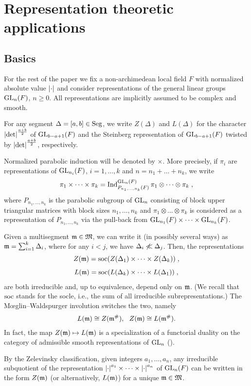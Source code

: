 \documentclass{ert-l} %
\begin{document}
\section{Representation theoretic applications}\label{sec: rep}

\subsection{Basics}
For the rest of the paper we fix a non-archimedean local field $F$ with normalized absolute value $\left|{\cdot}\right|$
and consider representations of the general linear groups $\operatorname{GL}_n(F)$, $n\ge0$.
All representations are implicitly assumed to be complex and smooth.

For any segment $\Delta=[a,b]\in \operatorname{Seg}$, we write $Z(\Delta)$ and $L(\Delta)$ for the character $\left|{\det}\right|^{\frac{a+b}2}$ of $\operatorname{GL}_{b-a+1}(F)$
and the Steinberg representation of $\operatorname{GL}_{b-a+1}(F)$ twisted by $\left|{\det}\right|^{\frac{a+b}2}$, respectively.

Normalized parabolic induction will be denoted by $\times$. More precisely, if $\pi_i$ are representations
of $\operatorname{GL}_{n_i}(F)$, $i=1,\dots,k$ and $n=n_1+\dots+n_k$, we write
\[
\pi_1\times\dots\times\pi_k=\operatorname{Ind}_{P_{n_1,\dots,n_k}(F)}^{\operatorname{GL}_n(F)}\pi_1\otimes\dots\otimes\pi_k\;,
\]
where $P_{n_1,\dots,n_k}$ is the parabolic subgroup of $\operatorname{GL}_n$ consisting of block upper triangular matrices
with block sizes $n_1,\dots,n_k$ and $\pi_1\otimes\dots\otimes\pi_k$ is considered as a representation of
$P_{n_1,\dots,n_k}$ via the pull-back from $\operatorname{GL}_{n_1}(F)\times\dots\times\operatorname{GL}_{n_k}(F)$.


Given a multisegment $\mathfrak{m}\in\mathfrak{M}$, we can write it (in possibly several ways) as $\mathfrak{m}=\sum_{i=1}^k\Delta_i$,
where for any $i<j$, we have $\Delta_i\not\ll\Delta_j$.
Then, the representations
\[
Z(\mathfrak{m})=\operatorname{soc}(Z(\Delta_1)\times\dots\times Z(\Delta_k))\;,
\]
\[
L(\mathfrak{m})=\operatorname{soc}(L(\Delta_k)\times\dots\times L(\Delta_1))\;,
\]
are both irreducible and, up to equivalence, depend only on $\mathfrak{m}$.
(We recall that $\operatorname{soc}$ stands for the socle, i.e., the sum of all irreducible subrepresentations.)
The M\oe glin--Waldspurger involution switches the two, namely
\[
L(\mathfrak{m})\cong Z(\mathfrak{m}^\#),\ \ Z(\mathfrak{m})\cong L(\mathfrak{m}^\#).
\]
In fact, the map $Z(\mathfrak{m})\mapsto L(\mathfrak{m})$ is a specialization of a functorial duality on the category
of admissible smooth representations of $\operatorname{GL}_n$ (\cites{MR1471867, MR3769724}).

By the Zelevinsky classification, given integers $a_1,\dots,a_n$, any irreducible subquotient
of the representation $\left|{\cdot}\right|^{a_1}\times\dots\times\left|{\cdot}\right|^{a_n}$
of $\operatorname{GL}_n(F)$ can be written in the form $Z(\mathfrak{m})$ (or alternatively, $L(\mathfrak{m})$) for a unique $\mathfrak{m}\in\mathfrak{M}$.
\end{document}
